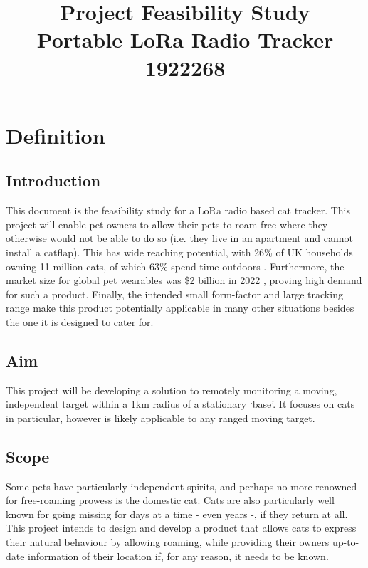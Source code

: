 \documentclass[11pt]{article}
\title{\huge Project Feasibility Study\\\Large Portable LoRa Radio Tracker\vspace{0.4em}\\\large 1922268\vspace{-2em}}
\author{}
\date{}
\begin{document}
\onehalfspacing

\maketitle

\section{Definition}
\subsection{Introduction}
This document is the feasibility study for a LoRa radio based cat tracker.
This project will enable pet owners to allow their pets to roam free where they otherwise would not be able to do so 
(i.e. they live in an apartment and cannot install a catflap).
This has wide reaching potential, with 26\% of UK households owning 11 million cats, of which 63\% spend time outdoors \cite{catsprotection:catsreport}.
Furthermore, the market size for global pet wearables was \$2 billion in 2022 \cite{researchandmarkets:wearablemarket}, proving high demand for such a product. 
Finally, the intended small form-factor and large tracking range make this product potentially applicable 
in many other situations besides the one it is designed to cater for.

\subsection{Aim}
This project will be developing a solution to remotely monitoring a moving,
independent target within a 1km radius of a stationary `base'.
It focuses on cats in particular, however is likely applicable to any ranged moving target.

\subsection{Scope}
Some pets have particularly independent spirits, and perhaps no more renowned for free-roaming prowess is the domestic cat.
Cats are also particularly well known for going missing for days at a time - even years \cite{bbc:missingcat} -, if they return at all.
This project intends to design and develop a product that allows cats to express their natural behaviour \cite{catsprotection:essentialguide} by allowing roaming, 
while providing their owners up-to-date information of their location if, for any reason, it needs to be known.
\end{document}

